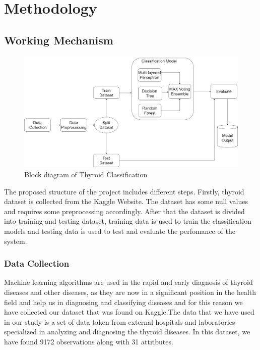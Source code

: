 \chapter{Methodology}

\section{Working Mechanism}


\begin{figure}[h]
\centering
\includegraphics[scale=0.26]{methodo.jpg}
\caption{Block diagram of Thyroid Classification}
\end{figure}
The proposed structure of the project includes different steps. Firstly, thyroid dataset is collected from the Kaggle Website. The dataset has some null values and requires some preprocessing accordingly. After that the dataset is divided into training and testing dataset, training data is used to train the classification models and testing data is used to test and evaluate the perfomance of the system.
\subsection{Data Collection}
Machine learning algorithms are used in the rapid and early diagnosis of thyroid diseases and other diseases, as they are now in a significant position in the health field and help us in diagnosing and classifying diseases and for this reason we have collected our dataset that was found on Kaggle.The data that we have used in our study is a set of data taken from external hospitals and laboratories specialized in analyzing and diagnosing the thyroid diseases. In this dataset, we have found 9172 observations along with 31 attributes. 
